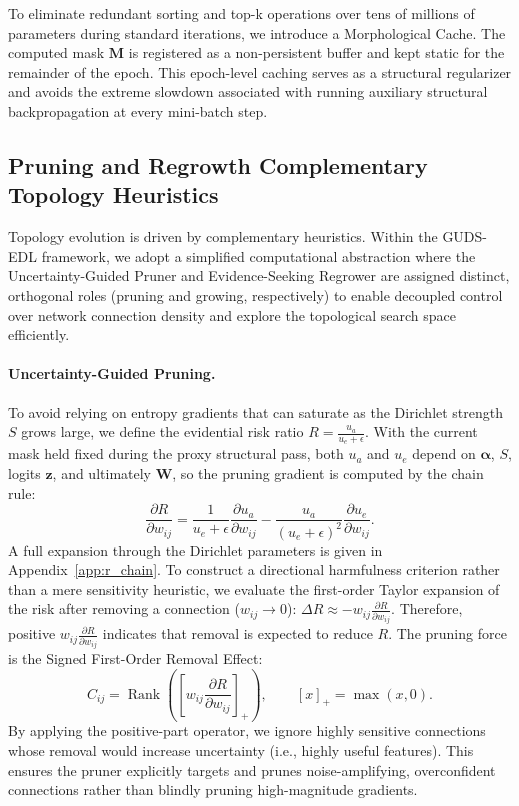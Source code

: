 \documentclass[letterpaper]{article} %
\newcommand{\pospart}[1]{\left[#1\right]_+}
\begin{document}
To eliminate redundant sorting and top-k operations over tens of millions of parameters during standard iterations, we introduce a Morphological Cache. The computed mask $\bm{M}$ is registered as a non-persistent buffer and kept static for the remainder of the epoch. This epoch-level caching serves as a structural regularizer and avoids the extreme slowdown associated with running auxiliary structural backpropagation at every mini-batch step.

\subsection{Pruning and Regrowth Complementary Topology Heuristics}
Topology evolution is driven by complementary heuristics. Within the GUDS-EDL framework, we adopt a simplified computational abstraction where the Uncertainty-Guided Pruner and Evidence-Seeking Regrower are assigned distinct, orthogonal roles (pruning and growing, respectively) to enable decoupled control over network connection density and explore the topological search space efficiently.

\paragraph{Uncertainty-Guided Pruning.}
To avoid relying on entropy gradients that can saturate as the Dirichlet strength $S$ grows large, we define the evidential risk ratio $R = \frac{u_a}{u_e + \epsilon}$. With the current mask held fixed during the proxy structural pass, both $u_a$ and $u_e$ depend on $\bm{\alpha}$, $S$, logits $\bm{z}$, and ultimately $\bm{W}$, so the pruning gradient is computed by the chain rule:
\begin{equation}\label{eq:r_chain_main}
    \frac{\partial R}{\partial w_{ij}}
    =
    \frac{1}{u_e+\epsilon}\frac{\partial u_a}{\partial w_{ij}}
    -\frac{u_a}{(u_e+\epsilon)^2}
    \frac{\partial u_e}{\partial w_{ij}} .
\end{equation}
A full expansion through the Dirichlet parameters is given in Appendix~\ref{app:r_chain}. To construct a directional harmfulness criterion rather than a mere sensitivity heuristic, we evaluate the first-order Taylor expansion of the risk after removing a connection ($w_{ij} \to 0$): $\Delta R \approx -w_{ij}\frac{\partial R}{\partial w_{ij}}$. Therefore, positive $w_{ij}\frac{\partial R}{\partial w_{ij}}$ indicates that removal is expected to reduce $R$. The pruning force is the Signed First-Order Removal Effect:
\begin{equation}\label{eq:C_ij}
    C_{ij}
    =
    \operatorname{Rank}\left(
    \pospart{w_{ij}\frac{\partial R}{\partial w_{ij}}}
    \right),
    \qquad
    \pospart{x}=\max(x,0).
\end{equation}
By applying the positive-part operator, we ignore highly sensitive connections whose removal would increase uncertainty (i.e., highly useful features). This ensures the pruner explicitly targets and prunes noise-amplifying, overconfident connections rather than blindly pruning high-magnitude gradients.
\end{document}
